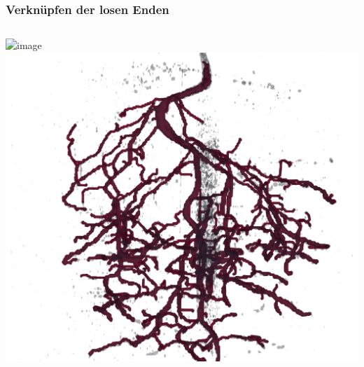 \documentclass[final,ngerman,ignorenonframetext,compress]{beamer}
\begin{document}
	\begin{frame}
		\frametitle{Verkn\"upfen der losen Enden}
		\begin{columns}
			\includegraphics<2>[width=\linewidth]{img/raw-4.png}
			\includegraphics[width=\linewidth]{img/L2_22aug_Ansicht2_tree.PNG}
		\end{columns}
	\end{frame}
\end{document}
